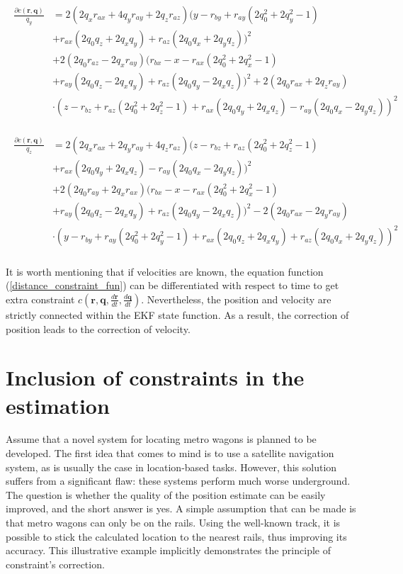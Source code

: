 \begin{align}
	\begin{split}
	\frac{\partial c(\bm{r}, \bm{q})}{q_y} &= 2(2q_xr_{ax} + 4q_yr_{ay} + 2q_zr_{az})(y - r_{by} + r_{ay}(2q_0^2 + 2q_y^2 - 1)\\
	&+ r_{ax}(2q_0q_z + 2q_xq_y) + r_{az}(2q_0q_x + 2q_yq_z))^2\\
	&+ 2(2q_0r_{az} - 2q_xr_{ay})(r_{bx} - x - r_{ax}(2q_0^2 + 2q_x^2 - 1) \\
	&+ r_{ay}(2q_0q_z - 2q_xq_y) + r_{az}(2q_0q_y - 2q_xq_z))^2 + 2(2q_0r_{ax} + 2q_zr_{ay})\\
	&\cdot(z - r_{bz} + r_{az}(2q_0^2 + 2q_z^2 - 1) + r_{ax}(2q_0q_y + 2q_xq_z) - r_{ay}(2q_0q_x - 2q_yq_z))^2
\end{split}
\end{align}

\begin{align}
	\begin{split}
	\frac{\partial c(\bm{r}, \bm{q})}{q_z} &= 2(2q_xr_{ax} + 2q_yr_{ay} + 4q_zr_{az})(z - r_{bz} + r_{az}(2q_0^2 + 2q_z^2 - 1)\\
	&+ r_{ax}(2q_0q_y + 2q_xq_z) - r_{ay}(2q_0q_x - 2q_yq_z))^2\\
	&+ 2(2q_0r_{ay} + 2q_xr_{ax})(r_{bx} - x - r_{ax}(2q_0^2 + 2q_x^2 - 1)\\
	&+ r_{ay}(2q_0q_z - 2q_xq_y) + r_{az}(2q_0q_y - 2q_xq_z))^2 - 2(2q_0r_{ax} - 2q_yr_{ay})\\
	&\cdot(y - r_{by} + r_{ay}(2q_0^2 + 2q_y^2 - 1) + r_{ax}(2q_0q_z + 2q_xq_y) + r_{az}(2q_0q_x + 2q_yq_z))^2
	\label{distance_constraint_der2}
\end{split}
\end{align}
\\

It is worth mentioning that if velocities are known, the equation function (\ref{distance_constraint_fun}) can be differentiated with respect to time to get extra constraint $c(\bm{r}, \bm{q}, \frac{d\bm{r}}{dt}, \frac{d\bm{q}}{dt})$. Nevertheless, the position and velocity are strictly connected within the EKF state function. As a result, the correction of position leads to the correction of velocity.


\section{Inclusion of constraints in the estimation}

Assume that a novel system for locating metro wagons is planned to be developed. The first idea that comes to mind is to use a satellite navigation system, as is usually the case in location-based tasks. However, this solution suffers from a significant flaw: these systems perform much worse underground. The question is whether the quality of the position estimate can be easily improved, and the short answer is yes. A simple assumption that can be made is that metro wagons can only be on the rails. Using the well-known track, it is possible to stick the calculated location to the nearest rails, thus improving its accuracy.
This illustrative example implicitly demonstrates the principle of constraint's correction.\\


